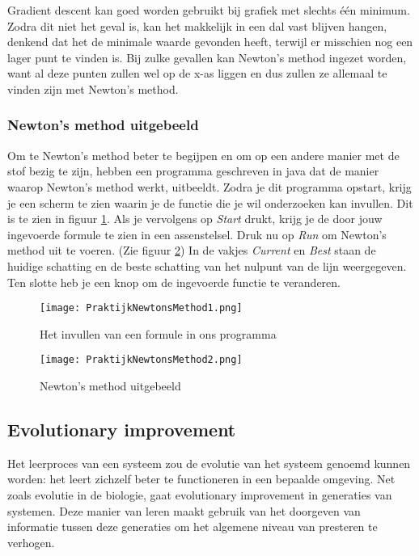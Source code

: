 Gradient descent kan goed worden gebruikt bij grafiek met slechts \'e\'en minimum. Zodra dit niet het geval is, kan het makkelijk in een dal vast blijven hangen, denkend dat het de minimale waarde gevonden heeft, terwijl er misschien nog een lager punt te vinden is. Bij zulke gevallen kan Newton's method ingezet worden, want al deze punten zullen wel op de x-as liggen en dus zullen ze allemaal te vinden zijn met Newton's method.

\subsubsection{Newton's method uitgebeeld}
Om te Newton's method beter te begijpen en om op een andere manier met de stof bezig te zijn, hebben een programma geschreven in java dat de manier waarop Newton's method werkt, uitbeeldt. Zodra je dit programma opstart, krijg je een scherm te zien waarin je de functie die je wil onderzoeken kan invullen. Dit is te zien in figuur \ref{fig:PraktijkNewtonsMethod1}. Als je vervolgens op \textit{Start} drukt, krijg je de door jouw ingevoerde formule te zien in een assenstelsel. Druk nu op \textit{Run} om Newton's method uit te voeren. (Zie figuur \ref{fig:PraktijkNewtonsMethod2}) In de vakjes \textit{Current} en \textit{Best} staan de huidige schatting en de beste schatting van het nulpunt van de lijn weergegeven. Ten slotte heb je een knop om de ingevoerde functie te veranderen.

\begin{figure}[h]
  \centering
    \texttt{[image: PraktijkNewtonsMethod1.png]}
  \caption{Het invullen van een formule in ons programma}
  \label{fig:PraktijkNewtonsMethod1}
\end{figure}

\begin{figure}[H]
  \centering
    \texttt{[image: PraktijkNewtonsMethod2.png]}
  \caption{Newton's method uitgebeeld}
  \label{fig:PraktijkNewtonsMethod2}
\end{figure}

\subsection{Evolutionary improvement}
Het leerproces van een systeem zou de evolutie van het systeem genoemd kunnen worden: het leert zichzelf beter te functioneren in een bepaalde omgeving. Net zoals evolutie in de biologie, gaat evolutionary improvement in generaties van systemen. Deze manier van leren maakt gebruik van het doorgeven van informatie tussen deze generaties om het algemene niveau van presteren te verhogen.

